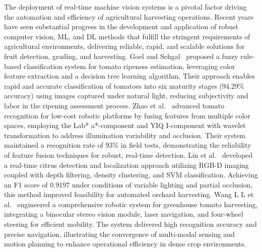\documentclass[a4paper,fleqn]{cas-dc}
\begin{document}

The deployment of real-time machine vision systems is a pivotal factor driving the automation and efficiency of agricultural harvesting operations. Recent years have seen substantial progress in the development and application of robust computer vision, ML, and DL methods that fulfill the stringent requirements of agricultural environments, delivering reliable, rapid, and scalable solutions for fruit detection, grading, and harvesting.
Goel and Sehgal~\cite{goel2015fuzzy} proposed a fuzzy rule-based classification system for tomato ripeness estimation, leveraging color feature extraction and a decision tree learning algorithm. Their approach enables rapid and accurate classification of tomatoes into six maturity stages (94.29\% accuracy) using images captured under natural light, reducing subjectivity and labor in the ripening assessment process.
Zhao et al.~\cite{zhao2016robust} advanced tomato recognition for low-cost robotic platforms by fusing features from multiple color spaces, employing the Lab* a*-component and YIQ I-component with wavelet transformation to address illumination variability and occlusion. Their system maintained a recognition rate of 93\% in field tests, demonstrating the reliability of feature fusion techniques for robust, real-time detection.
Lin et al.~\cite{lin2019field} developed a real-time citrus detection and localization approach utilizing RGB-D imaging coupled with depth filtering, density clustering, and SVM classification. Achieving an F1 score of 0.9197 under conditions of variable lighting and partial occlusion, this method improved feasibility for automated orchard harvesting.
Wang L L et al.~\cite{lili2017development} engineered a comprehensive robotic system for greenhouse tomato harvesting, integrating a binocular stereo vision module, laser navigation, and four-wheel steering for efficient mobility. The system delivered high recognition accuracy and precise navigation, illustrating the convergence of multi-modal sensing and motion planning to enhance operational efficiency in dense crop environments.
\end{document}
